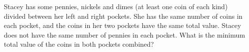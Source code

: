 Stacey has some pennies, nickels and dimes (at least one coin of each kind) divided between her left and right pockets. She has the same number of coins in each pocket, and the coins in her two pockets have the same total value. Stacey does not have the same number of pennies in each pocket. What is the minimum total value of the coins in both pockets combined?

